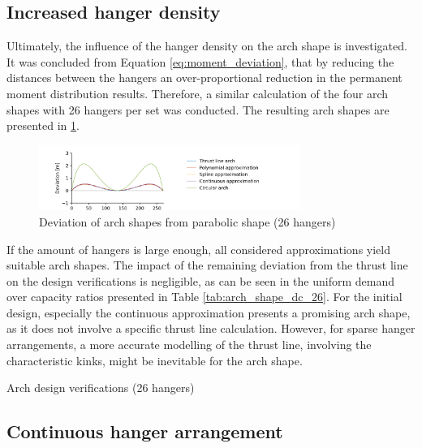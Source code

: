 \subsection{Increased hanger density} \label{sec:arch_shape_increased}
Ultimately, the influence of the hanger density on the arch shape is investigated. It was concluded from Equation \eqref{eq:moment_deviation}, that by reducing the distances between the hangers an over-proportional reduction in the permanent moment distribution results. Therefore, a similar calculation of the four arch shapes with 26 hangers per set was conducted. The resulting arch shapes are presented in \cref{fig:arch_shapes_26}.

\begin{figure}[H]
    \centering
    \includegraphics[trim={1cm 0 3cm 0},clip, width=0.76\textwidth]{calculations/arch shape/arch_shapes_26.png}
    \caption{Deviation of arch shapes from parabolic shape (26 hangers)}
    \label{fig:arch_shapes_26}
\end{figure}

If the amount of hangers is large enough, all considered approximations yield suitable arch shapes. The impact of the remaining deviation from the thrust line on the design verifications is negligible, as can be seen in the uniform demand over capacity ratios presented in Table \ref{tab:arch_shape_dc_26}. For the initial design, especially the continuous approximation presents a promising arch shape, as it does not involve a specific thrust line calculation. However, for sparse hanger arrangements, a more accurate modelling of the thrust line, involving the characteristic kinks, might be inevitable for the arch shape.

\begin{table}[H]
    \centering
    
    \caption{Arch design verifications (26 hangers)}
    \label{tab:arch_shape_dc_26}
\end{table}

\subsection{Continuous hanger arrangement} \label{sec:arch_shape_continuous}


